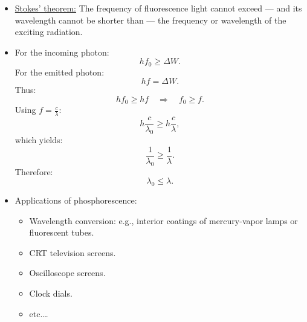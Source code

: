 \documentclass[t,aspectratio=169,xcolor=dvipsnames]{beamer}
\begin{document}
\begin{frame}
\begin{itemize}
\pagebreak
\item \underline{Stokes’ theorem:} The frequency of fluorescence light cannot exceed — and its wavelength cannot be shorter than — the frequency or wavelength of the exciting radiation.
\item For the incoming photon:
$$ hf_{0} \ge \Delta W. $$
For the emitted photon:
$$ hf = \Delta W.$$
Thus:
$$ hf_{0} \ge hf \quad \Rightarrow \quad f_{0} \ge f.$$
Using $f = \frac{c}{\lambda}$:
$$ h\frac{c}{\lambda_{0}} \ge h\frac{c}{\lambda},$$
which yields:
$$\frac{1}{\lambda_{0}} \ge \frac{1}{\lambda}.$$
Therefore:
$$\lambda_{0} \le \lambda.$$

\item Applications of phosphorescence:
\begin{itemize}
\item Wavelength conversion: e.g., interior coatings of mercury-vapor lamps or fluorescent tubes.
\item CRT television screens.
\item Oscilloscope screens.
\item Clock dials.
\item etc.\dots
\end{itemize}

\end{itemize}
\end{frame}

\end{document}
